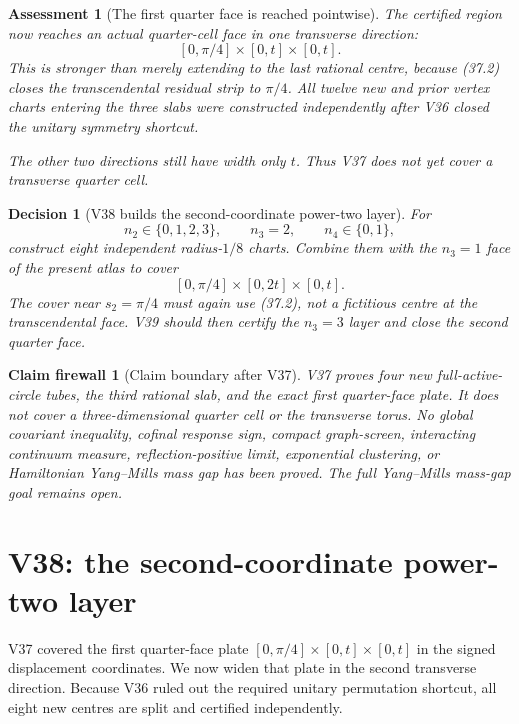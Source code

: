 \documentclass[11pt,oneside]{article}
\newtheorem{assessment}[theorem]{Assessment}
\newtheorem{firewall}[theorem]{Claim firewall}
\newtheorem{decision}[theorem]{Decision}
\theoremstyle{definition}
\theoremstyle{remark}
\begin{document}
\begin{assessment}[The first quarter face is reached pointwise]
\label{ass:newv37}
The certified region now reaches an actual quarter-cell face in one
transverse direction:
\[
 [0,\pi/4]\times[0,t]\times[0,t].
\]
This is stronger than merely extending to the last rational centre,
because (37.2) closes the transcendental residual strip to
\(\pi/4\).  All twelve new and prior vertex charts entering the
three slabs were constructed independently after V36 closed the
unitary symmetry shortcut.

The other two directions still have width only \(t\).  Thus V37
does not yet cover a transverse quarter cell.
\end{assessment}

\begin{decision}[V38 builds the second-coordinate power-two layer]
\label{dec:newv37-next}
For
\[
 n_2\in\{0,1,2,3\},\qquad n_3=2,\qquad n_4\in\{0,1\}, \tag{37.21}
\]
construct eight independent radius-\(1/8\) charts.  Combine them
with the \(n_3=1\) face of the present atlas to cover
\[
 [0,\pi/4]\times[0,2t]\times[0,t].
\]
The cover near \(s_2=\pi/4\) must again use (37.2), not a fictitious
centre at the transcendental face.  V39 should then certify the
\(n_3=3\) layer and close the second quarter face.
\end{decision}

\begin{firewall}[Claim boundary after V37]
\label{fire:newv37-final}
V37 proves four new full-active-circle tubes, the third rational
slab, and the exact first quarter-face plate.  It does not cover a
three-dimensional quarter cell or the transverse torus.  No global
covariant inequality, cofinal response sign, compact graph-screen,
interacting continuum measure, reflection-positive limit,
exponential clustering, or Hamiltonian Yang--Mills mass gap has
been proved.  The full Yang--Mills mass-gap goal remains open.
\end{firewall}

\section{V38: the second-coordinate power-two layer}
\label{sec:newv38-second-layer}

V37 covered the first quarter-face plate
\([0,\pi/4]\times[0,t]\times[0,t]\) in the signed displacement
coordinates.  We now widen that plate in the second transverse
direction.  Because V36 ruled out the required unitary permutation
shortcut, all eight new centres are split and certified
independently.
\end{document}
